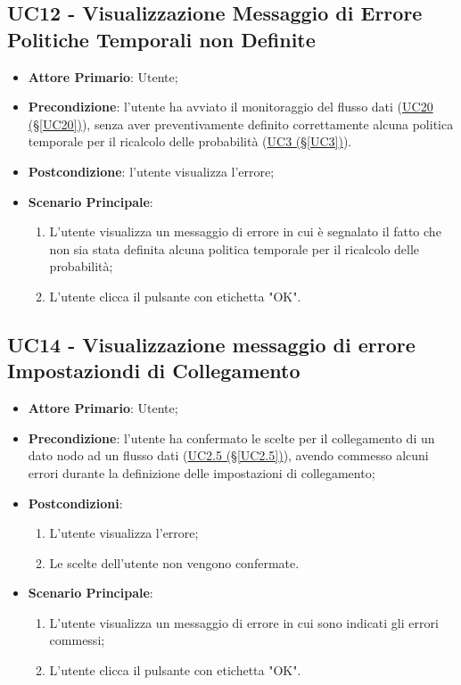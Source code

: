 \pagebreak

\subsection{UC12 - Visualizzazione Messaggio di Errore Politiche Temporali non Definite}\label{UC12}
\begin{itemize}
\item \textbf{Attore Primario}: Utente;
\item \textbf{Precondizione}: l'utente ha avviato il monitoraggio del flusso dati (\hyperref[UC20]{UC20 							(§\ref*{UC20})}), senza aver preventivamente definito correttamente alcuna politica temporale per il ricalcolo delle probabilità (\hyperref[UC3]{UC3 (§\ref*{UC3})}).
\item \textbf{Postcondizione}: l'utente visualizza l'errore;
\item \textbf{Scenario Principale}: 
	\begin{enumerate}
	\item L'utente visualizza un messaggio di errore in cui è segnalato il fatto che non sia stata definita alcuna 				politica temporale per il ricalcolo delle probabilità;
	\item L'utente clicca il pulsante con etichetta "OK".
	\end{enumerate}
\end{itemize}

\newpage

\subsection{UC14 - Visualizzazione messaggio di errore Impostaziondi di Collegamento}\label{UC14}
\begin{itemize}
\item \textbf{Attore Primario}: Utente;
\item \textbf{Precondizione}: l'utente ha confermato le scelte per il collegamento di un dato nodo ad un flusso 				dati (\hyperref[UC2.5]{UC2.5 (§\ref*{UC2.5})}), avendo commesso alcuni errori durante la definizione delle impostazioni di collegamento;
\item \textbf{Postcondizioni}: 
	\begin{enumerate}
	\item L'utente visualizza l'errore;
	\item Le scelte dell'utente non vengono confermate.
	\end{enumerate}
\item \textbf{Scenario Principale}: 
	\begin{enumerate}
	\item L'utente visualizza un messaggio di errore in cui sono indicati gli errori commessi;
	\item L'utente clicca il pulsante con etichetta "OK".
	\end{enumerate}
\end{itemize}

